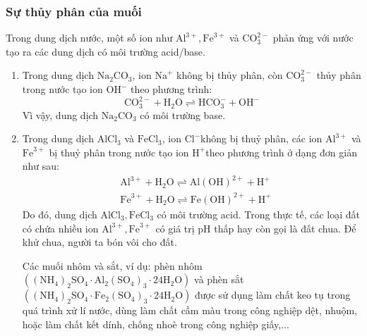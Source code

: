 \subsubsection{Sự thủy phân của muối}
Trong dung dịch nước, một số ion như $\mathrm{Al}^{3+}, \mathrm{Fe}^{3+}$ và $\mathrm{CO}_3^{2-}$ phản ứng với nước tạo ra các dung dịch có môi trường acid/base.
\begin{vidu}
	\begin{enumerate}
		\item Trong dung dịch $\mathrm{Na}_2 \mathrm{CO}_3$, ion $\mathrm{Na}^{+}$ không bị thủy phân, còn $\mathrm{CO}_3^{2-}$ thủy phân trong nước tạo ion $\mathrm{OH}^{-}$ theo phương trình:
		\[
		\mathrm{CO}_3^{2-}+\mathrm{H}_2 \mathrm{O} \rightleftharpoons \mathrm{HCO}_3^{-}+\mathrm{OH}^{-}
		\]
		Vì vậy, dung dịch $\mathrm{Na}_2 \mathrm{CO}_3$ có môi trường base.
		\item Trong dung dịch $\mathrm{AlCl}_3$ và $\mathrm{FeCl}_3$, ion $\mathrm{Cl}^{-}$không bị thuỷ phân, các ion $\mathrm{Al}^{3+}$ và $\mathrm{Fe}^{3+}$ bị thuỷ phân trong nước tạo ion $\mathrm{H}^{+}$theo phương trình ở dạng đơn giản như sau:
		\[
		\begin{aligned}
			& \mathrm{Al}^{3+}+\mathrm{H}_2 \mathrm{O} \rightleftharpoons \mathrm{Al}(\mathrm{OH})^{2+}+\mathrm{H}^{+} \\
			& \mathrm{Fe}^{3+}+\mathrm{H}_2 \mathrm{O} \rightleftharpoons \mathrm{Fe}(\mathrm{OH})^{2+}+\mathrm{H}^{+}
		\end{aligned}
		\]
		Do đó, dung dịch $\mathrm{AlCl}_3, \mathrm{FeCl}_3$ có môi trường acid. Trong thực tế, các loại đất có chứa nhiều ion $\mathrm{Al}^{3+}, \mathrm{Fe}^{3+}$ có giá trị pH thấp hay còn gọi là đất chua. Để khử chua, người ta bón vôi cho đất.
		
		Các muối nhôm và sắt, ví dụ: phèn nhôm $\left(\left(\mathrm{NH}_4\right)_2 \mathrm{SO}_4 \cdot \mathrm{Al}_2\left(\mathrm{SO}_4\right)_3 \cdot 24 \mathrm{H}_2 \mathrm{O}\right)$ và phèn sắt $\left(\left(\mathrm{NH}_4\right)_2 \mathrm{SO}_4 \cdot \mathrm{Fe}_2\left(\mathrm{SO}_4\right)_3 \cdot 24 \mathrm{H}_2 \mathrm{O}\right)$ được sử dụng làm chất keo tụ trong quá trình xử lí nước, dùng làm chất cầm màu trong công nghiệp dệt, nhuộm, hoặc làm chất kết dính, chống nhoè trong công nghiệp giấy,...
	\end{enumerate}
\end{vidu}
